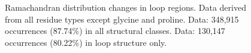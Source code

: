 \begin{figure}[hbtp]
\begin{center}
{       \quad
             }
\caption[Ramachanran distribution changes in loop regions]%
{Ramachandran distribution changes in loop regions. Data derived from all residue types except glycine and proline. Data: 348,915 occurrences (87.74\%) in all structural classes. Data: 130,147 occurrences (80.22\%) in loop structure only.}
    \label{fig:reducedrep:ramachandran}
  \end{center}
\end{figure}

